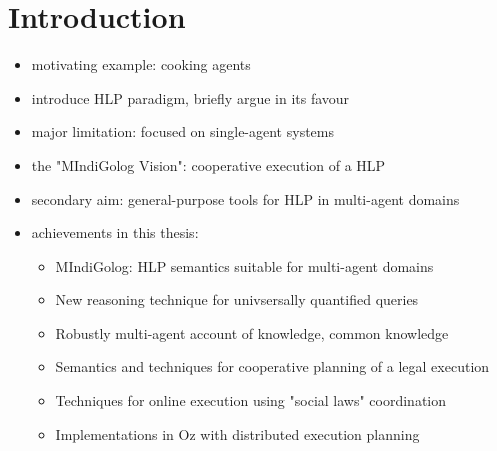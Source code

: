 \chapter{Introduction}

\begin{itemize}
\item motivating example: cooking agents
\item introduce HLP paradigm, briefly argue in its favour
\item major limitation: focused on single-agent systems
\item the "MIndiGolog Vision": cooperative execution of a HLP
\item secondary aim: general-purpose tools for HLP in multi-agent domains
\item achievements in this thesis:
  \begin{itemize}
  \item MIndiGolog: HLP semantics suitable for multi-agent domains
  \item New reasoning technique for univsersally quantified queries
  \item Robustly multi-agent account of knowledge, common knowledge
  \item Semantics and techniques for cooperative planning of a legal execution
  \item Techniques for online execution using "social laws" coordination
  \item Implementations in Oz with distributed execution planning
  \end{itemize}
\end{itemize}

